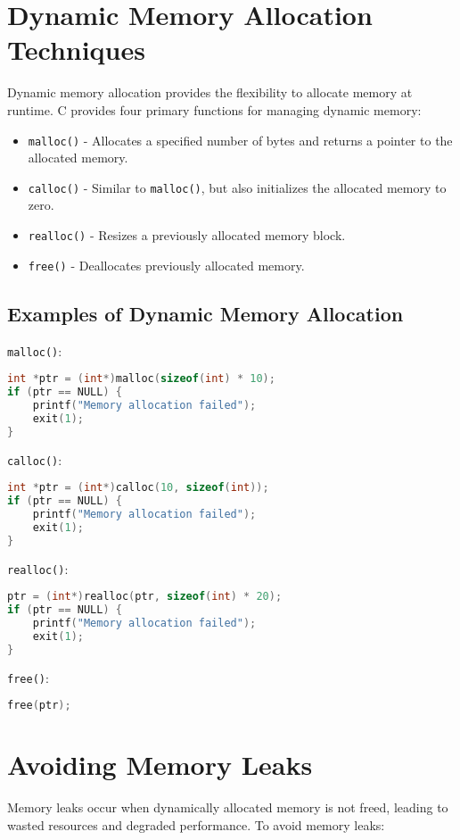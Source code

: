 \documentclass[a4paper,12pt]{article}
\begin{document}
\section{Dynamic Memory Allocation Techniques}
Dynamic memory allocation provides the flexibility to allocate memory at runtime. C provides four primary functions for managing dynamic memory:

\begin{itemize}
    \item \texttt{malloc()} - Allocates a specified number of bytes and returns a pointer to the allocated memory.
    \item \texttt{calloc()} - Similar to \texttt{malloc()}, but also initializes the allocated memory to zero.
    \item \texttt{realloc()} - Resizes a previously allocated memory block.
    \item \texttt{free()} - Deallocates previously allocated memory.
\end{itemize}

\subsection*{Examples of Dynamic Memory Allocation}

\texttt{malloc()}:
\begin{lstlisting}[language=C]
int *ptr = (int*)malloc(sizeof(int) * 10);  
if (ptr == NULL) {
    printf("Memory allocation failed");
    exit(1);
}
\end{lstlisting}
\texttt{calloc()}:
\begin{lstlisting}[language=C]
int *ptr = (int*)calloc(10, sizeof(int));  
if (ptr == NULL) {
    printf("Memory allocation failed");
    exit(1);
}
\end{lstlisting}
\texttt{realloc()}:
\begin{lstlisting}[language=C]
ptr = (int*)realloc(ptr, sizeof(int) * 20); 
if (ptr == NULL) {
    printf("Memory allocation failed");
    exit(1);
}
\end{lstlisting}
\texttt{free()}:
\begin{lstlisting}[language=C]
free(ptr);
\end{lstlisting}

\section{Avoiding Memory Leaks}
Memory leaks occur when dynamically allocated memory is not freed, leading to wasted resources and degraded performance. To avoid memory leaks:
\end{document}
